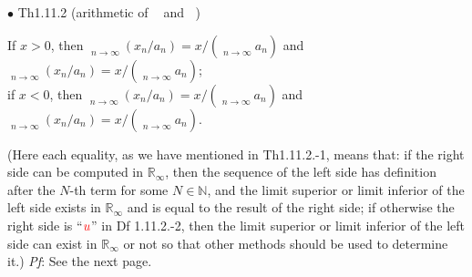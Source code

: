 \documentclass{article}
\begin{document}
\begin{Th}{$\bullet$ Th1.11.2 (arithmetic of $\mathop{\overline{\lim}}$ and $\mathop{\underline{\lim}}$)}
\begin{compactenum}
        If $x>0$, then $\mathop{\overline{\lim}}\limits_{n\to\infty}(x_n/a_n) = x/\left(\mathop{\underline{\lim}}\limits_{n\to\infty}a_n\right)$ and $\mathop{\underline{\lim}}\limits_{n\to\infty}(x_n/a_n) = x/\left(\mathop{\overline{\lim}}\limits_{n\to\infty}a_n\right)$;\\
        if $x<0$, then $\mathop{\overline{\lim}}\limits_{n\to\infty}(x_n/a_n) = x/\left(\mathop{\overline{\lim}}\limits_{n\to\infty}a_n\right)$ and $\mathop{\underline{\lim}}\limits_{n\to\infty}(x_n/a_n) = x/\left(\mathop{\underline{\lim}}\limits_{n\to\infty}a_n\right)$. 
    \end{compactenum}
    (Here each equality, as we have mentioned in Th1.11.2.-1, means that: if the right side can be computed in $\mathbb{R}_\infty$, then the sequence of the left side has definition after the $N$-th term for some $N\in\mathbb{N}$, and the limit superior or limit inferior of the left side exists in $\mathbb{R}_\infty$ and is equal to the result of the right side; if otherwise the right side is ``$\textcolor{red}{u}$'' in Df 1.11.2.-2, then the limit superior or limit inferior of the left side can exist in $\mathbb{R}_\infty$ or not so that other methods should be used to determine it.)
    \tcblower
    \textit{Pf}: See the next page.
\end{Th}
\end{document}
